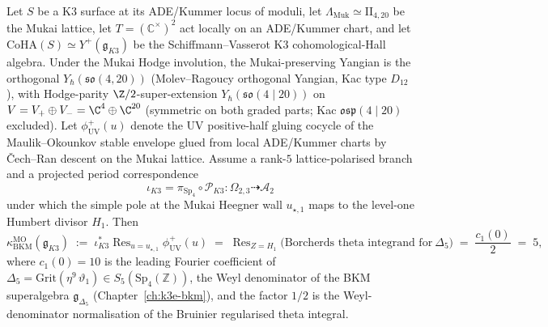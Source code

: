 \begin{conjecture}[MO residue at Mukai--Heegner wall computes $\kappa_{\mathrm{BKM}}(\Delta_5) = 5$]
\label{thm:bl-mo-k3e-kappa5}
\ClaimStatusConjectured
Let $S$ be a K3 surface at its ADE/Kummer locus of moduli, let
$\Lambda_{\mathrm{Muk}} \simeq \mathrm{II}_{4,20}$ be the Mukai
lattice, let $T = (\mathbb{C}^{\times})^{2}$ act locally on an
ADE/Kummer chart, and let
$\mathrm{CoHA}(S) \simeq Y^{+}(\mathfrak{g}_{K3})$ be the
Schiffmann--Vasserot K3 cohomological-Hall algebra. Under the Mukai
Hodge involution, the Mukai-preserving Yangian is the orthogonal
$Y_\hbar(\mathfrak{so}(4, 20))$ (Molev--Ragoucy orthogonal Yangian,
Kac type $D_{12}$), with Hodge-parity
$\Z/2$-super-extension $Y_\hbar(\mathfrak{so}(4 \mid 20))$ on
$V = V_+ \oplus V_- = \C^4 \oplus \C^{20}$ (symmetric on both graded
parts; Kac $\mathfrak{osp}(4 \mid 20)$ excluded). Let
$\phi^{+}_{\mathrm{UV}}(u)$ denote the UV positive-half gluing
cocycle of the Maulik--Okounkov stable envelope glued from local
ADE/Kummer charts by \v{C}ech--Ran descent on the Mukai lattice.
Assume a rank-\(5\) lattice-polarised branch and a projected period correspondence
\[
 \iota_{K3}=\pi_{\mathrm{Sp}_4}\circ\mathscr P_{K3}
 \colon \Omega_{2,3}\dashrightarrow \mathcal A_2
\]
under which the simple pole at the Mukai Heegner wall \(u_{\star,1}\)
maps to the level-one Humbert divisor \(H_1\). Then
\[
 \kappa_{\mathrm{BKM}}^{\mathrm{MO}}(\mathfrak{g}_{K3})
 \;:=\;
 \iota_{K3}^{*}\!\mathop{\mathrm{Res}}_{u = u_{\star, 1}}\!
 \phi^{+}_{\mathrm{UV}}(u)
 \;=\;
 \mathop{\mathrm{Res}}_{Z = H_{1}}\!
 \bigl(\text{Borcherds theta integrand for}\
 \Delta_{5}\bigr)
 \;=\;
 \frac{c_{1}(0)}{2}
 \;=\;
 5,
\]
where $c_{1}(0) = 10$ is the leading Fourier coefficient of
$\Delta_{5} = \mathrm{Grit}(\eta^{9}\,\vartheta_{1}) \in
S_{5}(\mathrm{Sp}_{4}(\mathbb{Z}))$, the Weyl denominator of the
BKM superalgebra $\mathfrak{g}_{\Delta_{5}}$
(Chapter~\ref{ch:k3e-bkm}), and the factor $1/2$ is the Weyl-denominator
 normalisation of the Bruinier regularised theta integral.
\end{conjecture}


